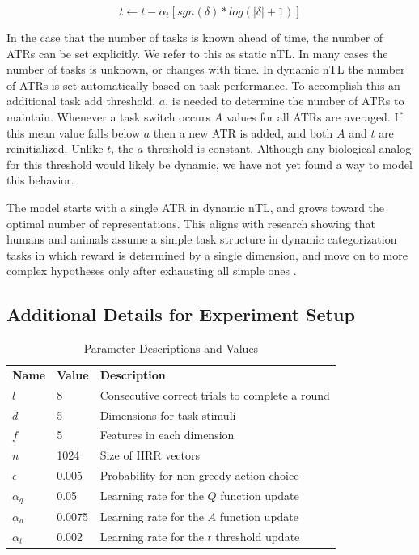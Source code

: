 \documentclass[10pt,letterpaper]{article}
\begin{document}
\begin{equation}
t \leftarrow t - \alpha_t [sgn(\delta) * log(|\delta| + 1)]
\label{eq:t_update}
\end{equation}

In the case that the number of tasks is known ahead of time, the number of ATRs can be set explicitly. We refer to this as static nTL. In many cases the number of tasks is unknown, or changes with time. In dynamic nTL the number of ATRs is set automatically based on task performance. To accomplish this an additional task add threshold, $a$, is needed to determine the number of ATRs to maintain. Whenever a task switch occurs $ A $ values for all ATRs are averaged. If this mean value falls below $ a $ then a new ATR is added, and both $ A $ and $ t $ are reinitialized. Unlike $ t $, the $ a $ threshold is constant. Although any biological analog for this threshold would likely be dynamic, we have not yet found a way to model this behavior.

The model starts with a single ATR in dynamic nTL, and grows toward the optimal number of representations. This aligns with research showing that humans and animals assume a simple task structure in dynamic categorization tasks in which reward is determined by a single dimension, and move on to more complex hypotheses only after exhausting all simple ones \cite{shepard_learning_1961}.

\subsection{Additional Details for Experiment Setup}

\begin{table}[!b]
{\small
  \caption{Parameter Descriptions and Values }
  \label{tab:parameters}
  \centering
  \begin{tabular}{lll}
    \toprule
    \midrule
    \textbf{Name}     & \textbf{Value}    & \textbf{Description}   \\
    $ l $   & 8         & Consecutive correct trials to complete a round \\
    $ d $   & 5         & Dimensions for task stimuli \\
    $ f $   & 5         & Features in each dimension \\
    $ n $   & 1024      & Size of HRR vectors \\
    $ \epsilon $ & 0.005 & Probability for non-greedy action choice \\
    $ \alpha_q $ & 0.05  & Learning rate for the $ Q $ function update \\
    $ \alpha_a $ & 0.0075 & Learning rate for the $ A $ function update \\
    $ \alpha_t $ & 0.002 & Learning rate for the $ t $ threshold update \\
    \bottomrule
  \end{tabular}
}
\end{table}
\end{document}

